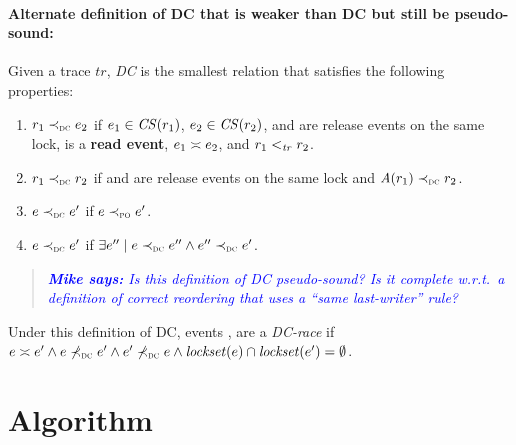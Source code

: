 \documentclass[letter,10pt]{article}
\newcommand{\CS}[1]{\ensuremath{\mathit{CS(}#1)}\xspace}
\newcommand{\lockset}[1]{\ensuremath{\mathit{lockset}(#1)}\xspace}
\newcommand{\commonLocks}[2]{\ensuremath{\lockset{#1} \cap \lockset{#2}}}
\newcommand{\conflicts}[2]{\ensuremath{#1 \asymp #2}} %
\newcommand{\getAcquire}[1]{\ensuremath{\mathit{A}(#1)}\xspace}
\newcommand{\tr}{\ensuremath{\mathit{tr}}\xspace}
\newcommand{\PO}{PO\xspace}
\newcommand{\WDC}{DC\xspace}
\newcommand{\DC}{\WDC}
\newcommand{\nDCOrdered}[2]{\nWDCOrdered{#1}{#2}}
\newcommand{\ltTR}{\ensuremath{<_\textsc{\tr}}\xspace}
\newcommand{\ltPO}{\ensuremath{\prec_\textsc{\tiny{\PO}}}\xspace}
\newcommand{\ltWDC}{\ensuremath{\prec_\textsc{\tiny{\WDC}}}\xspace}
\newcommand{\nltWDC}{\ensuremath{\not\prec_\textsc{\tiny{\WDC}}}\xspace}
\newcommand{\Ordered}[3]{\ensuremath{#1 #2 #3}}
\newcommand{\TROrdered}[2]{\Ordered{#1}{\ltTR}{#2}}
\newcommand{\POOrdered}[2]{\Ordered{#1}{\ltPO}{#2}}
\newcommand{\WDCOrdered}[2]{\Ordered{#1}{\ltWDC}{#2}}
\newcommand{\nWDCOrdered}[2]{\Ordered{#1}{\nltWDC}{#2}}
\newcommand{\originalgrumbler}[2]{\begin{quote}\textcolor{blue}{\sl{\bf #1 says:} #2}\end{quote}}
\newcommand{\grumbler}[2]{\originalgrumbler{#1}{#2}}
\newcommand{\mike}[1]{\grumbler{Mike}{#1}}
\begin{document}
\paragraph{Alternate definition of \DC that is weaker than \DC but still be pseudo-sound:}


Given a trace \tr, \textit{\DC} is the smallest relation that satisfies
the following properties:

\begin{enumerate}[label=(\alph*)]
  \item \WDCOrdered{\event{r}{_1}}{\event{e}{_2}}
  if $\event{e}{_1} \in \CS{\event{r}{_1}}$, $\event{e}{_2} \in \CS{\event{r}{_2}}$,
   and  are release events on the same lock,
   is a \textbf{read event},
  \conflicts{\event{e}{_1}}{\event{e}{_2}}, and 
  \TROrdered{\event{r}{_1}}{\event{r}{_2}}.
  
  \item \WDCOrdered{\event{r}{_1}}{\event{r}{_2}} if
   and  are release events on the same lock and
  \WDCOrdered{\getAcquire{\event{r}{_1}}}{\event{r}{_2}}.
  
  \item \WDCOrdered{\event{e}{}}{\event{e}{'}}
  if \POOrdered{\event{e}{}}{\event{e}{'}}.
  
  \item \WDCOrdered{\event{e}{}}{\event{e}{'}} 
  if $\exists e'' \mid \WDCOrdered{\event{e}{}}{\event{e}{''}} \land \WDCOrdered{\event{e}{''}}{\event{e}{'}}$.
\end{enumerate}

\mike{Is this definition of \DC pseudo-sound?
Is it complete w.r.t.\ a definition of correct reordering that uses a ``same last-writer'' rule?}

\noindent
Under this definition of \DC, events ,  are a \textit{\DC-race} if
$\conflicts{\event{e}{}}{\event{e}{'}} \land \nDCOrdered{\event{e}{}}{\event{e}{'}} \land
\nDCOrdered{\event{e}{'}}{\event{e}{}} \land \commonLocks{\event{e}{}}{\event{e}{'}} = \emptyset$.

\section{Algorithm}

\newcommand{\addvc}{\sqcup}
\newcommand{\lessvc}{\sqsubseteq}
\newcommand{\slessvc}{\sqsubset}
\newcommand{\forif}[4]{\textbf{foreach}\xspace \ensuremath{#1 \in #2} \textbf{if}\xspace \ensuremath{#3} \textbf{do}\xspace #4}
\newcommand{\for}[3]{\textbf{foreach}\xspace \ensuremath{#1 \in #2} \textbf{do} #3}
\newcommand{\update}[2]{\ensuremath{#1 \gets #1 #2}}
\end{document}

